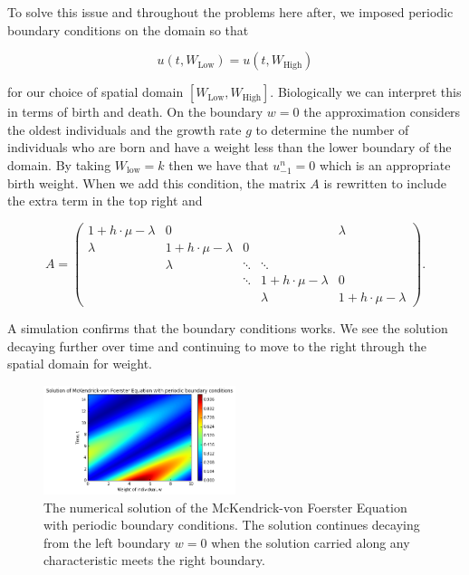 \documentclass[../main.tex]{subfiles}
\begin{document}
  To solve this issue and throughout the problems here after, we imposed periodic boundary conditions on the domain so that

  \begin{equation}
    u(t, W_{\mathrm{Low}}) = u(t, W_{\mathrm{High}})
  \end{equation}

  for our choice of spatial domain $[W_{\mathrm{Low}}, W_{\mathrm{High}}]$. Biologically we can interpret this in terms of birth and death. On the boundary $w = 0$ the approximation considers the oldest individuals and the growth rate $g$ to determine the number of individuals who are born and have a weight less than the lower boundary of the domain. By taking $W_{\mathrm{low}} = k$ then we have that $u^n_{-1} = 0$ which is an appropriate birth weight. When we add this condition, the matrix $A$ is rewritten to include the extra term in the top right and

  \begin{equation}
    A = \begin{pmatrix}
      1 + h \cdot \mu - \lambda   & 0                         &         &                           & \lambda \\
      \lambda                     & 1 + h \cdot \mu - \lambda & 0       &\\
                                  & \lambda                   & \ddots  & \ddots                    & \\
                                  &                           & \ddots  & 1 + h \cdot \mu - \lambda & 0 \\
                                  &                           &         & \lambda                   & 1 + h \cdot \mu - \lambda
    \end{pmatrix}.
  \end{equation}

  A simulation confirms that the boundary conditions works. We see the solution decaying further over time and continuing to move to the right through the spatial domain for weight.

  \begin{figure}[htb]
    \centering
    \includegraphics[width=0.5\textwidth]{_assets/advection_period.png}
    \caption{\label{method:fig:advectionPeriodic} The numerical solution of the McKendrick-von Foerster Equation with periodic boundary conditions. The solution continues decaying from the left boundary $w = 0$ when the solution carried along any characteristic meets the right boundary.}
  \end{figure}
\end{document}
